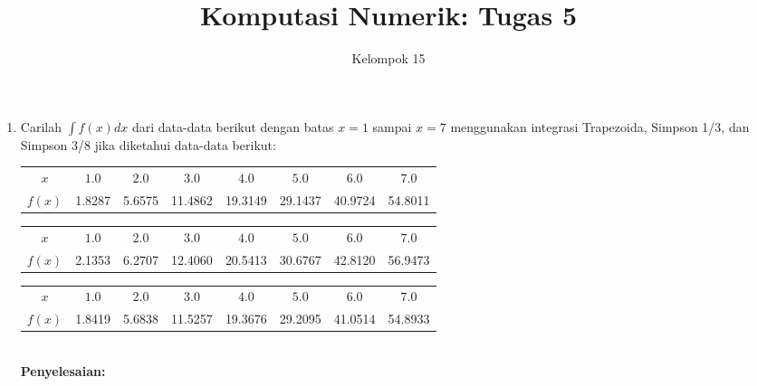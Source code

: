 \documentclass{article}
\title{\textbf{Komputasi Numerik: Tugas 5}}
\author{Kelompok 15}
\date{}
\newcommand{\penyelesaian}{\textbf{Penyelesaian: }}
\begin{document}
\maketitle

\begin{enumerate}
    \item Carilah $\int f(x) dx$ dari data-data berikut dengan batas $x=1$ sampai $x=7$ menggunakan integrasi Trapezoida, Simpson 1/3, dan Simpson 3/8 jika diketahui data-data berikut: \\
    \begin{tabular}{ c c c c c c c c }
        $x$ & $\num{1,0}$ & $\num{2,0}$ & $\num{3,0}$ & $\num{4,0}$ & $\num{5,0}$ & $\num{6,0}$ & $\num{7,0}$\\
        $f(x)$ & \num{1,8287} & \num{5,6575} & \num{11,4862} & \num{19,3149} & \num{29,1437} & \num{40,9724} & \num{54,8011} \\
    \end{tabular}
    \begin{tabular}{ c c c c c c c c }
        $x$ & $\num{1,0}$ & $\num{2,0}$ & $\num{3,0}$ & $\num{4,0}$ & $\num{5,0}$ & $\num{6,0}$ & $\num{7,0}$\\
        $f(x)$ & \num{2,1353} & \num{6,2707} & \num{12,4060} & \num{20,5413} & \num{30,6767} & \num{42,8120} & \num{56,9473} \\
    \end{tabular}
    \begin{tabular}{ c c c c c c c c }
        $x$ & $\num{1,0}$ & $\num{2,0}$ & $\num{3,0}$ & $\num{4,0}$ & $\num{5,0}$ & $\num{6,0}$ & $\num{7,0}$\\
        $f(x)$ & \num{1,8419} & \num{5,6838} & \num{11,5257} & \num{19,3676} & \num{29,2095} & \num{41,0514} & \num{54,8933} \\
    \end{tabular} \\
    \penyelesaian 

\end{enumerate}
\end{document}
